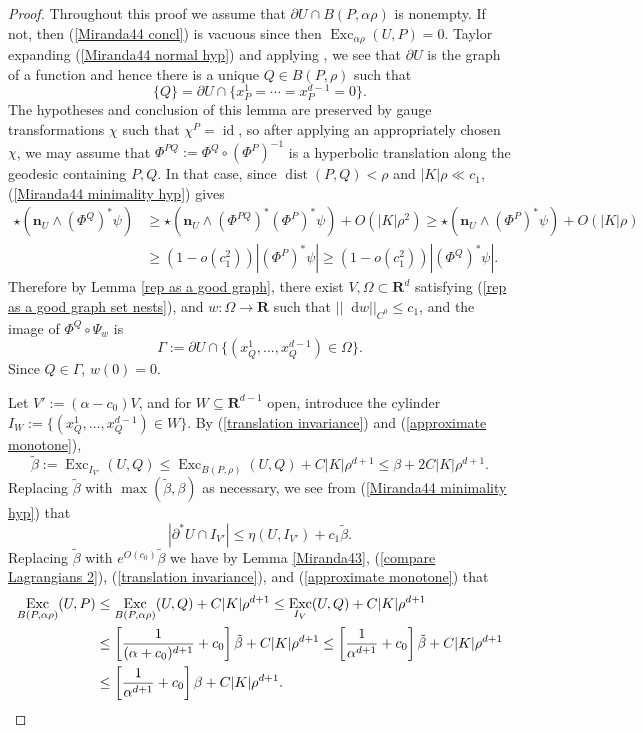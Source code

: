 \documentclass[reqno,10pt]{amsart}
\newcommand{\RR}{\mathbf{R}}
\DeclareMathOperator{\Exc}{Exc}
\DeclareMathOperator{\id}{id}
\newcommand*\dif{\mathop{}\!\mathrm{d}}
\DeclareMathOperator{\dist}{dist}
\newcommand{\normal}{\mathbf n}
\theoremstyle{definition}
\numberwithin{equation}{section}
\begin{document}
\begin{proof}
Throughout this proof we assume that $\partial U \cap B(P, \alpha \rho)$ is nonempty.
If not, then (\ref{Miranda44 concl}) is vacuous since then $\Exc_{\alpha \rho} (U, P) = 0$.
Taylor expanding (\ref{Miranda44 normal hyp}) and applying \cite[Theorem 4.8]{Giusti77}, we see that $\partial U$ is the graph of a function and hence there is a unique $Q \in B(P, \rho)$ such that 
$$\{Q\} = \partial U \cap \{x_P^1 = \cdots = x_P^{d - 1} = 0\}.$$
The hypotheses and conclusion of this lemma are preserved by gauge transformations $\chi$ such that $\chi^P = \id$, so after applying an appropriately chosen $\chi$, we may assume that $\Phi^{PQ} := \Phi^Q \circ (\Phi^P)^{-1}$ is a hyperbolic translation along the geodesic containing $P, Q$. In that case, since $\dist(P, Q) < \rho$ and $|K| \rho \ll c_1$, (\ref{Miranda44 minimality hyp}) gives
\begin{align*}
\star(\normal_U \wedge (\Phi^Q)^* \psi) &\geq \star(\normal_U \wedge (\Phi^{PQ})^* (\Phi^P)^* \psi) + O(|K| \rho^2) \geq \star (\normal_U \wedge (\Phi^P)^* \psi) + O(|K| \rho) \\
&\geq (1 - o(c_1^2)) |(\Phi^P)^* \psi| \geq (1 - o(c_1^2)) |(\Phi^Q)^* \psi|.
\end{align*}
Therefore by Lemma \ref{rep as a good graph}, there exist $V, \Omega \subset \RR^d$ satisfying (\ref{rep as a good graph set nests}), and $w: \Omega \to \RR$ such that $||\dif w||_{C^0} \leq c_1$, and the image of $\Phi^Q \circ \Psi_w$ is
$$\Gamma := \partial U \cap \{(x_Q^1, \dots, x_Q^{d - 1}) \in \Omega\}.$$
Since $Q \in \Gamma$, $w(0) = 0$.

Let $V' := (\alpha - c_0) V$, and for $W \subseteq \RR^{d - 1}$ open, introduce the cylinder $I_W := \{(x^1_Q, \dots, x^{d - 1}_Q) \in W\}$.
By (\ref{translation invariance}) and (\ref{approximate monotone}),
$$\tilde \beta := \Exc_{I_{V'}} (U, Q) \leq \Exc_{B(P, \rho)} (U, Q) + C|K| \rho^{d + 1} \leq \beta + 2C|K| \rho^{d + 1}.$$
Replacing $\tilde \beta$ with $\max(\tilde \beta, \beta)$ as necessary, we see from (\ref{Miranda44 minimality hyp}) that
$$|\partial^* U \cap I_{V'}| \leq \eta(U, I_{V'}) + c_1 \tilde \beta.$$
Replacing $\tilde \beta$ with $e^{O(c_0)} \tilde \beta$ we have by Lemma \ref{Miranda43}, (\ref{compare Lagrangians 2}), (\ref{translation invariance}), and (\ref{approximate monotone}) that 
\begin{align*}
\Exc_{B(P, \alpha \rho)} (U, P) &\leq \Exc_{B(P, \alpha \rho)} (U, Q) + C|K| \rho^{d + 1} \leq \Exc_{I_V} (U, Q) + C|K| \rho^{d + 1}\\
&\leq \left[\frac{1}{(\alpha + c_0)^{d + 1}} + c_0\right] \tilde \beta + C|K| \rho^{d + 1} \leq \left[\frac{1}{\alpha^{d + 1}} + c_0\right] \tilde \beta + C|K| \rho^{d + 1} \\
&\leq \left[\frac{1}{\alpha^{d + 1}} + c_0\right] \beta + C|K| \rho^{d + 1}. 
\qedhere 
\end{align*}
\end{proof}
\end{document}
